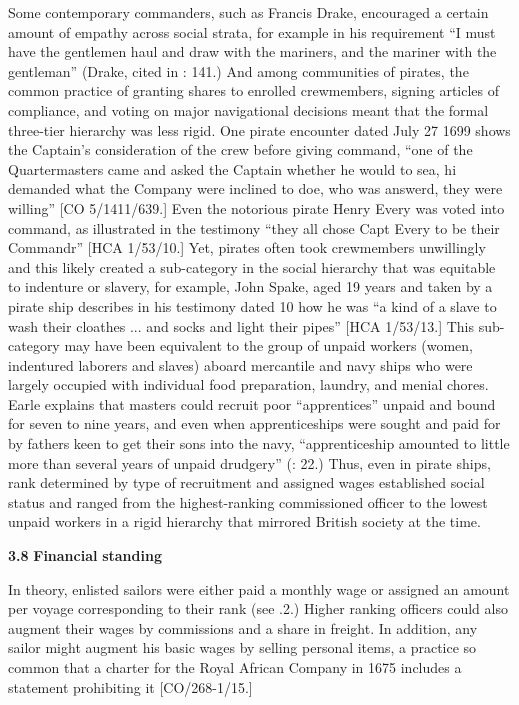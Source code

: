 Some contemporary commanders, such as Francis Drake, encouraged a certain amount of empathy across social strata, for example in his requirement “I must have the gentlemen haul and draw with the mariners, and the mariner with the gentleman” (Drake, cited in \citealt{Bicheno2012}: 141.) And among communities of pirates, the common practice of granting shares to enrolled crewmembers, signing articles of compliance, and voting on major navigational decisions meant that the formal three-tier hierarchy was less rigid. One pirate encounter dated July 27 1699 shows the Captain’s consideration of the crew before giving command, “one of the Quartermasters came and asked the Captain whether he would to sea, hi demanded what the Company were inclined to doe, who was answerd, they were willing” [CO 5/1411/639.] Even the notorious pirate Henry Every was voted into command, as illustrated in the testimony “they all chose Capt Every to be their Commandr” [HCA 1/53/10.] Yet, pirates often took crewmembers unwillingly and this likely created a sub-category in the social hierarchy that was equitable to indenture or slavery, for example, John Spake, aged 19 years and taken by a pirate ship describes in his testimony dated 10 \citealt{September1696} how he was “a kind of a slave to wash their cloathes ... and socks and light their pipes” [HCA 1/53/13.] This sub-category may have been equivalent to the group of unpaid workers (women, indentured laborers and slaves) aboard mercantile and navy ships who were largely occupied with individual food preparation, laundry, and menial chores.  Earle explains that masters could recruit poor “apprentices” unpaid and bound for seven to nine years, and even when apprenticeships were sought and paid for by fathers keen to get their sons into the navy, “apprenticeship amounted to little more than several years of unpaid drudgery” (\citealt{Earle1998}: 22.) Thus, even in pirate ships, rank determined by type of recruitment and assigned wages established social status and ranged from the highest-ranking commissioned officer to the lowest unpaid workers in a rigid hierarchy that mirrored British society at the time. 

\textbf{3.8} \textbf{Financial} \textbf{standing}

In theory, enlisted sailors were either paid a monthly wage or assigned an amount per voyage corresponding to their rank (see .2.) Higher ranking officers could also augment their wages by commissions and a share in freight. In addition, any sailor might augment his basic wages by selling personal items, a practice so common that a charter for the Royal African Company in 1675 includes a statement prohibiting it [CO/268-1/15.]  

